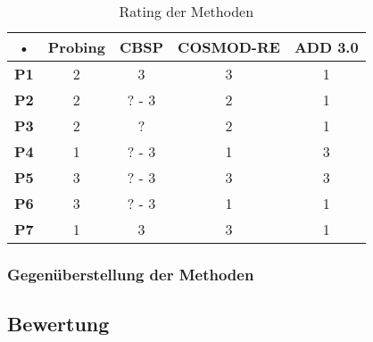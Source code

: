 \begin{table}[h] %
\caption{Rating der Methoden}
\centering
\begin{tabular}{|c|c|c|c|c|}
\hline 
\rule[-1ex]{0pt}{2.5ex} • & \textbf{Probing} & \textbf{CBSP} & \textbf{COSMOD-RE} & \textbf{ADD 3.0} \\ 
\hline 
\rule[-1ex]{0pt}{2.5ex} \textbf{P1} & 2 & 3 & 3 & 1 \\ 
\hline 
\rule[-1ex]{0pt}{2.5ex} \textbf{P2} & 2 & ? - 3 & 2 & 1 \\ 
\hline 
\rule[-1ex]{0pt}{2.5ex} \textbf{P3} & 2 & ? & 2 & 1 \\ 
\hline 
\rule[-1ex]{0pt}{2.5ex} \textbf{P4} & 1 & ? - 3 & 1 & 3 \\ 
\hline 
\rule[-1ex]{0pt}{2.5ex} \textbf{P5} & 3 & ? - 3 & 3 & 3 \\ 
\hline 
\rule[-1ex]{0pt}{2.5ex} \textbf{P6} & 3 & ? - 3 & 1 & 1 \\ 
\hline 
\rule[-1ex]{0pt}{2.5ex} \textbf{P7} & 1 & 3 & 3 & 1 \\ 
\hline 
\end{tabular} 
\label{tab:method_rating}
\end{table}






\subsubsection{Gegenüberstellung der Methoden}





\subsection{Bewertung}